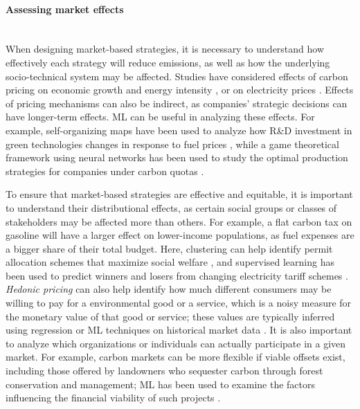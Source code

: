 \documentclass[11pt]{report}
\newcommand{\Gap}{\texorpdfstring{\hfill}{}}
\begin{document}
\paragraph*{Assessing market effects}\Gap\mbox{}\\
When designing market-based strategies, it is necessary to understand how effectively each strategy will reduce emissions, as well as how the underlying socio-technical system may be affected. 
Studies have considered effects of carbon pricing on economic growth and energy intensity \cite{fang2017investigating,fang2018optimize}, or on electricity prices \cite{nagapurkar2019techno}. 
Effects of pricing mechanisms can also be indirect, as companies' strategic decisions can have longer-term effects. ML can be useful in analyzing these effects. For example, self-organizing maps have been used to analyze how R\&D investment in green technologies changes in response to fuel prices \cite{barbieri2016fuel}, while a game theoretical framework using neural networks has been used to study the optimal production strategies for companies under carbon quotas \cite{zheng2018optimal}.


To ensure that market-based strategies are effective and equitable, it is important to understand their distributional effects, as certain social groups or classes of stakeholders may be affected more than others. For example, a flat carbon tax on gasoline will have a larger effect on lower-income populations, as fuel expenses are a bigger share of their total budget. Here, clustering can help identify permit allocation schemes that maximize social welfare \cite{wu2019research}, and supervised learning has been used to predict winners and losers from changing electricity tariff schemes \cite{granell2014predicting}. \emph{Hedonic pricing} can also help identify how much different consumers may be willing to pay for a environmental good or a service, which is a noisy measure for the monetary value of that good or service;  these values are typically inferred using regression or ML techniques on historical market data \cite{hedonic_residential, hedonic_park, hedonic_theory,hedonic_air}.
It is also important to analyze which organizations or individuals can actually participate in a given market.
For example, carbon markets can be more flexible if viable offsets exist, including those offered by landowners who sequester carbon through forest conservation and management; ML has been used to examine the factors influencing the financial viability of such projects \cite{kerchner2015california}. 
\end{document}

